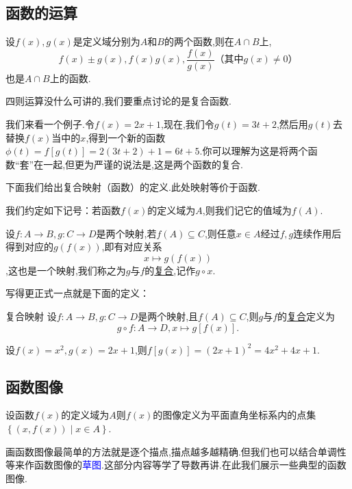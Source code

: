 \documentclass[lang=cn,math=cm,chinesefont=nofont,11pt,scheme=chinese,twocol]{elegantbook}
\begin{document}
\subsection{函数的运算}

设$f(x),g(x)$是定义域分别为$A$和$B$的两个函数,则在$A\cap B$上,$$f(x)\pm g(x),f(x)g(x),\dfrac{f(x)}{g(x)}\text{（其中}g(x)\neq 0\text{）}$$也是$A\cap B$上的函数.

四则运算没什么可讲的,我们要重点讨论的是复合函数.

我们来看一个例子.令$f(x)=2x+1$,现在,我们令$g(t)=3t+2$,然后用$g(t)$去替换$f(x)$当中的$x$,得到一个新的函数$\phi(t)=f[g(t)]=2(3t+2)+1=6t+5$.你可以理解为这是将两个函数“套”在一起,但更为严谨的说法是,这是两个函数的复合.

下面我们给出复合映射（函数）的定义.此处映射等价于函数.

\begin{remark}
  我们约定如下记号：若函数$f(x)$的定义域为$A$,则我们记它的值域为$f(A)$.
\end{remark}

设$f:A\rightarrow B,g:C\rightarrow D$是两个映射,若$f(A)\subseteq C$,则任意$x\in A$经过$f,g$连续作用后得到对应的$g(f(x))$,即有对应关系$$x\mapsto g(f(x))$$,这也是一个映射,我们称之为$g$与$f$的\underline{复合},记作$g\circ x$.

写得更正式一点就是下面的定义：

\begin{definition}{复合映射}
  设$f:A\rightarrow B,g:C\rightarrow D$是两个映射,且$f(A)\subseteq C$,则$g$与$f$的\underline{复合}定义为$$g\circ f:A\rightarrow D,x\mapsto g[f(x)].$$
\end{definition}

\begin{example}
  设$f(x)=x^2,g(x)=2x+1$,则$f[g(x)]=(2x+1)^2=4x^2+4x+1$.
\end{example}

\subsection{函数图像}

\begin{definition}
  设函数$f(x)$的定义域为$A$则$f(x)$的图像定义为平面直角坐标系内的点集$\left\{(x,f(x))\mid x\in A\right\}$.
\end{definition}

画函数图像最简单的方法就是逐个描点,描点越多越精确.但我们也可以结合单调性等来作函数图像的\textcolor{blue}{草图}.这部分内容等学了导数再讲.在此我们展示一些典型的函数图像.
\end{document}
